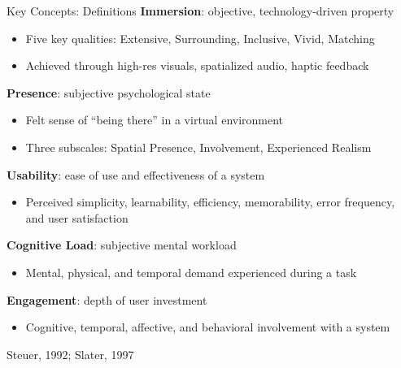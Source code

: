\documentclass[aspectratio=169, 12pt]{beamer}
\newcommand{\citefooter}[1]{\hfill{\tiny #1}}
\begin{document}
\begin{frame}{Key Concepts: Definitions}
	\textbf{\textcolor{gbAqua}{Immersion}}: objective, technology-driven property
	\begin{itemize}
		\item Five key qualities: Extensive, Surrounding, Inclusive, Vivid, Matching
		\item Achieved through high-res visuals, spatialized audio, haptic feedback
	\end{itemize}

	\vspace{0.19cm}
	\textbf{\textcolor{gbAqua}{Presence}}: subjective psychological state
	\begin{itemize}
		\item Felt sense of ``being there'' in a virtual environment
		\item Three subscales: Spatial Presence, Involvement, Experienced Realism
	\end{itemize}

	\vspace{0.19cm}
	\textbf{\textcolor{gbAqua}{Usability}}: ease of use and effectiveness of a system
	\begin{itemize}
		\item Perceived simplicity, learnability, efficiency, memorability, error frequency, and user satisfaction 
	\end{itemize}

	\vspace{0.19cm}
	\textbf{\textcolor{gbAqua}{Cognitive Load}}: subjective mental workload
	\begin{itemize}
		\item Mental, physical, and temporal demand experienced during a task
	\end{itemize}

	\vspace{0.19cm}
	\textbf{\textcolor{gbAqua}{Engagement}}: depth of user investment
	\begin{itemize}
		\item Cognitive, temporal, affective, and behavioral involvement with a system
	\end{itemize}

	\citefooter{Steuer, 1992; Slater, 1997}
\end{frame}
\end{document}
